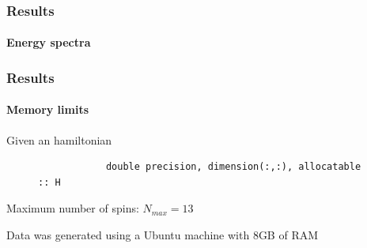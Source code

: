 \documentclass[pt12]{beamer}
\begin{document}
\begin{frame}[fragile,label=Results]
	\frametitle{Results}
	\framesubtitle{Energy spectra}
	\tableofcontents[pausesections]
	\begin{figure}[h]
		\centering
		\hspace{-1cm}
		\hspace{-1cm}
	\end{figure}
\begin{figure}[h]
	\centering
	\makebox[\textwidth][c]{
	
	\hspace{-.5cm}
	\hspace{-.5cm} }
\end{figure}
\end{frame}


\begin{frame}[fragile,label=Results]
	\frametitle{Results}
	\framesubtitle{Memory limits}
	\tableofcontents[pausesections]
	Given an hamiltonian\vspace*{-.5cm}\\
	\begin{figure}[!h]
		\begin{verbatim}
			double precision, dimension(:,:), allocatable :: H
		\end{verbatim}
	\end{figure}
	Maximum number of spins: $N_{max}=13$\vspace*{-.5cm}\\
	\begin{figure}[h]
		\centering
		\hspace{-1cm}
	\end{figure}
\tiny{Data was generated using a Ubuntu machine with 8GB of RAM}
\end{frame}


\end{document}

